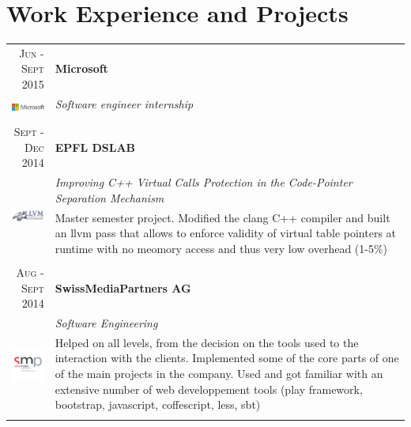 \documentclass[a4paper,11pt]{article} %
\begin{document}

\section{Work Experience and Projects}

\begin{tabularx}{\textwidth}{r|X}


\textsc{Jun - Sept 2015} & \textbf{Microsoft} \\
\multirow{2}{*}{ \includegraphics[width=60pt]{img/microsoft.eps}}
& \emph{Software engineer internship}\\ 
& \footnotesize{}\\
\multicolumn{2}{c}{} \\


\textsc{Sept - Dec 2014} & \textbf{EPFL DSLAB} \\
\multirow{2}{*}{ \includegraphics[width=60pt]{img/llvm.eps}}
& \emph{Improving C++ Virtual Calls Protection in the Code-Pointer Separation Mechanism}\\ 
& \footnotesize{Master semester project. Modified the clang C++ compiler and
built an llvm pass that allows to enforce validity of virtual table pointers at
runtime with no meomory access and thus very low overhead (1-5\%)}\\
\multicolumn{2}{c}{} \\


\textsc{Aug - Sept 2014} & \textbf{SwissMediaPartners AG} \\
\multirow{4}{*}{ \includegraphics[width=60pt]{img/smp.jpg}}
& \emph{Software Engineering}\\ 
& \footnotesize{Helped on all levels, from the decision on the tools used to the
interaction with the clients. Implemented some of the core parts of one of the
main projects in the company. Used and got familiar with an extensive number of
web developpement tools (play framework, bootstrap, javascript, coffescript,
less, sbt)}\\
\multicolumn{2}{c}{} \\


\end{tabularx}
\end{document}

